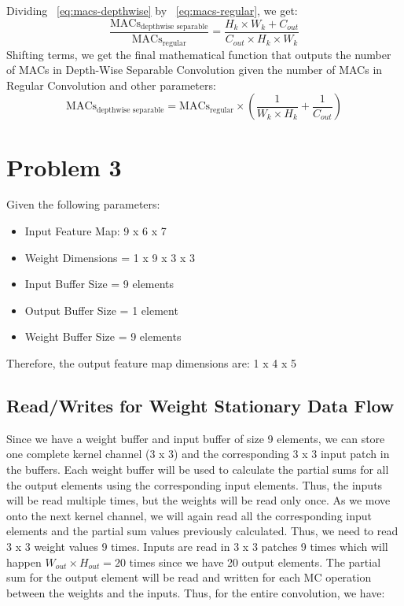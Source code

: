 \documentclass{article}
\begin{document}
Dividing ~\ref{eq:macs-depthwise} by ~\ref{eq:macs-regular}, we get:
\begin{equation}
    \frac{\text{MACs}_{\text{depthwise separable}}}{\text{MACs}_{\text{regular}}} = \frac{H_k \times W_k + C_{out}}{C_{out} \times H_k \times W_k}
\end{equation}
Shifting terms, we get the final mathematical function that outputs the number of MACs in Depth-Wise Separable Convolution given the number of MACs in Regular Convolution and other parameters:
\begin{equation}
    \text{MACs}_{\text{depthwise separable}} = \text{MACs}_{\text{regular}} \times \left(\frac{1}{W_k \times H_k} + \frac{1}{C_{out}}\right)
\end{equation}

\section{Problem 3}
Given the following parameters:
\begin{itemize}
    \item Input Feature Map: 9 x 6 x 7
    \item Weight Dimensions = 1 x 9 x 3 x 3
    \item Input Buffer Size = 9 elements
    \item Output Buffer Size = 1 element
    \item Weight Buffer Size = 9 elements
\end{itemize}

Therefore, the output feature map dimensions are: 1 x 4 x 5

\subsection{Read/Writes for Weight Stationary Data Flow}

Since we have a weight buffer and input buffer of size 9 elements, we can store one complete kernel channel (3 x 3) and the corresponding 3 x 3 input patch in the buffers.
Each weight buffer will be used to calculate the partial sums for all the output elements using the corresponding input elements. Thus, the inputs will be read multiple times, but the weights will be read only once.
As we move onto the next kernel channel, we will again read all the corresponding input elements and the partial sum values previously calculated. 
Thus, we need to read 3 x 3 weight values 9 times. Inputs are read in 3 x 3 patches 9 times which will happen $W_{out} \times H_{out} = 20$ times since we have 20 output elements.
The partial sum for the output element will be read and written for each MC operation between the weights and the inputs. 
Thus, for the entire convolution, we have:
\end{document}
